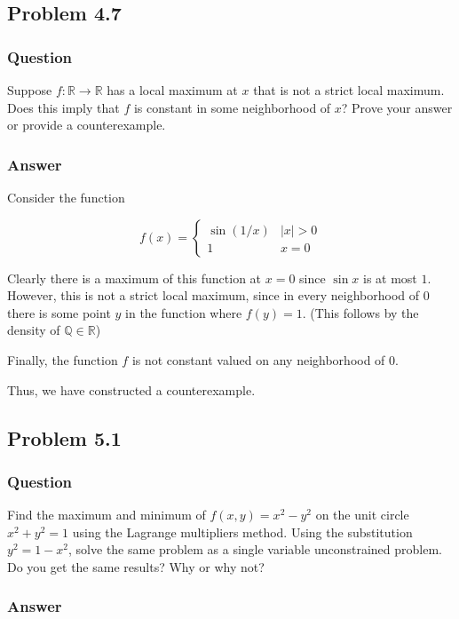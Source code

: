 \documentclass[12pt]{article}
\begin{document}
\subsection{Problem 4.7}
\subsubsection{Question}
Suppose $f:\mathbb{R} \to \mathbb{R}$ has a local maximum at $x$ that is not a strict local maximum. Does this imply that $f$ is constant in some neighborhood of $x$? Prove your answer or provide a counterexample.


\subsubsection{Answer}

Consider the function 

\[f(x)= \left\{ \begin{array} {lr} \sin{(1/x)} & |x|>0 \\ 1& x = 0 \end{array} \right.\]

Clearly there is a maximum of this function at $x=0$ since $\sin{x}$ is at most $1$. However, this is not a strict local maximum, since in every neighborhood of $0$ there is some point $y$ in the function where $f(y)=1$. (This follows by the density of $\mathbb{Q} \in \mathbb{R}$)

Finally, the function $f$ is not constant valued on any neighborhood of $0$.

Thus, we have constructed a counterexample.

\subsection{Problem 5.1}
\subsubsection{Question}
Find the maximum and minimum of $f(x,y)=x^2-y^2$ on the unit circle $x^2+y^2=1$ using the Lagrange multipliers method. Using the substitution $y^2=1-x^2$, solve the same problem as a single variable unconstrained problem. Do you get the same results? Why or why not?


\subsubsection{Answer}
\end{document}
